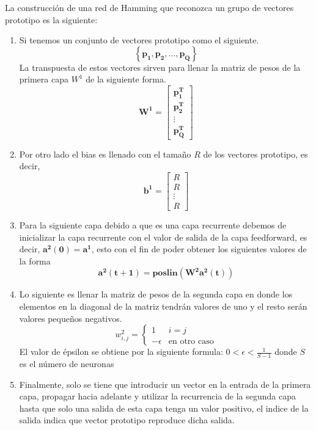 \documentclass[12pt, titlepage]{article}
\begin{document}
    La construcción de una red de Hamming que reconozca un grupo de vectores prototipo es la siguiente:
    \begin{enumerate}
        \item Si tenemos un conjunto de vectores prototipo como el siguiente.
        \[ \left\lbrace \boldsymbol{p_1, p_2, ..., p_Q} \right\rbrace  \]
        La transpuesta de estos vectores sirven para llenar la matriz de pesos de la primera capa $W^1$ de la siguiente forma.
        \[\boldsymbol{ W^{1}} = \left[\begin{array}{c}\boldsymbol{p^{T}_1}\\\boldsymbol{ p^{T}_2}\\ \vdots \\ \boldsymbol{p^{T}_Q}\end{array}\right]  \]
        \item Por otro lado el bias es llenado con el tamaño $R$ de los vectores prototipo, es decir,
        \[ \boldsymbol{b^{1}} = \left[\begin{array}{c}R\\ R\\ \vdots \\ R\end{array}\right] \]
        \item Para la siguiente capa debido a que es una capa recurrente debemos de inicializar la capa recurrente con el valor de salida de la capa feedforward, es decir, $\boldsymbol{a^2(0) = a^1}$, esto con el fin de poder obtener los siguientes valores de la forma 
        \[  \boldsymbol{a^2(t+1) = poslin(W^2a^2(t))}\]
        \item Lo siguiente es llenar la matriz de pesos de la segunda capa en donde los elementos en la diagonal de la matriz tendrán valores de uno y el resto serán valores pequeños negativos.
        \[ w^2_{i,j} = \begin{cases} 1 & i=j \\-\epsilon & \text{en otro caso} \end{cases} \]
        El valor de épsilon se obtiene por la siguiente formula: $ 0 < \epsilon <\frac{1}{S-1}$ donde $S$ es el número de neuronas
        \item Finalmente, solo se tiene que introducir un vector en la entrada de la primera capa, propagar hacia adelante y utilizar la recurrencia de la segunda capa hasta que solo una salida de esta capa tenga un valor positivo, el indice de la salida indica que vector prototipo reproduce dicha salida.
    \end{enumerate}
\newpage
\end{document}
